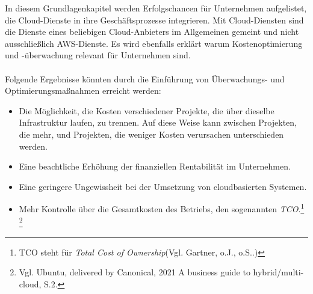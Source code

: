 In diesem Grundlagenkapitel werden Erfolgschancen für Unternehmen aufgelistet, die Cloud-Dienste in ihre Geschäftsprozesse integrieren. Mit Cloud-Diensten sind die Dienste eines beliebigen Cloud-Anbieters im Allgemeinen gemeint und nicht ausschließlich AWS-Dienste. 
Es wird ebenfalls erklärt warum Kostenoptimierung und -überwachung relevant für Unternehmen sind.
\\\\
Folgende Ergebnisse könnten durch die Einführung von Überwachungs- und Optimierungsmaßnahmen erreicht werden:
\begin{itemize}
      \item
            Die Möglichkeit, die Kosten verschiedener Projekte, die über dieselbe Infrastruktur laufen, zu trennen.
            Auf diese Weise kann zwischen Projekten, die mehr, und Projekten, die weniger Kosten verursachen unterschieden werden.%
      \item
            Eine beachtliche Erhöhung der finanziellen Rentabilität im Unternehmen.%
      \item
            Eine geringere Ungewissheit bei der Umsetzung von cloudbasierten Systemen.
      \item
            Mehr Kontrolle über die Gesamtkosten des Betriebs, den sogenannten \textit{TCO}.\footnote{TCO steht für \textit{Total Cost of Ownership}(Vgl. Gartner, o.J., o.S.\cite{TCO}.)}{ }\footnote{Vgl. Ubuntu, delivered by Canonical, 2021 A business guide to hybrid/multi-cloud, S.2.\cite{CAN01}}

\end{itemize}




